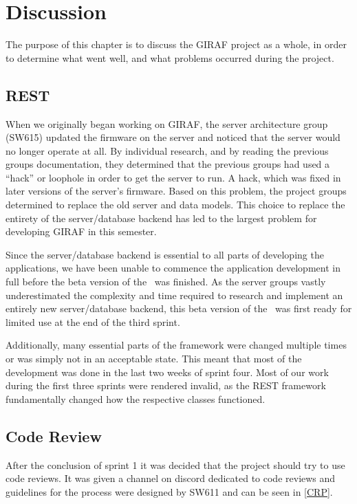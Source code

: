\chapter{Discussion}
The purpose of this chapter is to discuss the GIRAF project as a whole, in order
to determine what went well, and what problems occurred during the project.

\section{REST}
When we originally began working on GIRAF, the server
architecture group (SW615) updated the firmware on the server and noticed that
the server would no longer operate at all. By individual research, and by
reading the previous groups documentation, they determined that the previous
groups had used a ``hack'' or loophole in order to get the server to run. A
hack, which was fixed in later versions of the server's firmware. Based on this
problem, the project groups determined to replace the old
server and data models. This choice to replace the entirety of
the server/database backend has led to the largest problem for developing GIRAF
in this semester.\nl

Since the server/database backend is essential to all parts of developing the
applications, we have been unable to commence the application development in
full before the beta version of the \rlib\ was finished. As the server groups
vastly underestimated the complexity and time required to research and
implement an entirely new server/database backend, this beta version of the
\rlib\ was first ready for limited use at the end of the third sprint.\nl

Additionally, many essential parts of the framework were changed multiple times
or was simply not in an acceptable state. This meant that most of the
development was done in the last two weeks of sprint four. Most of our work
during the first three sprints were rendered invalid, as the REST framework
fundamentally changed how the respective classes functioned.

\section{Code Review}
After the conclusion of sprint 1 it was decided that the project should try to
use code reviews. It was given a channel on discord dedicated to code reviews
and guidelines for the process were designed by SW611 and can be seen in
\autoref{CRP}.\nl

